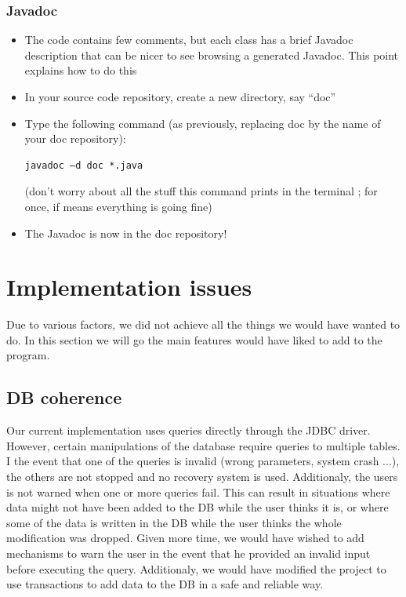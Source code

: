 \documentclass[a4paper ,12pt,french]{article}
\begin{document}
\subsubsection{Javadoc}


\begin{itemize}
\item The code contains few comments, but each class has a brief Javadoc description that can be nicer to see browsing a generated Javadoc. This point explains how to do this
\item In your source code repository, create a new directory, say “doc”
\item Type the following command (as previously, replacing doc by the name of your doc repository):
\begin{verbatim}
javadoc –d doc *.java
\end{verbatim}
(don’t worry about all the stuff this command prints in the terminal ; for once, if means everything is going fine)
\item The Javadoc is now in the doc repository!
\end{itemize}
\newpage

\section{Implementation issues}
Due to various factors, we did not achieve all the things we would have wanted to do. In this section we will go the main features would have liked to add to the program.

\subsection{DB coherence}
Our current implementation uses queries directly through the JDBC driver. However, certain manipulations of the database require queries to multiple tables. I the event that one of the queries is invalid (wrong parameters, system crash ...), the others are not stopped and no recovery system is used. Additionaly, the users is not warned when one or more queries fail. This can result in situations where data might not have been added to the DB while the user thinks it is, or where some of the data is written in the DB while the user thinks the whole modification was dropped.
Given more time, we would have wished to add mechanisms to warn the user in the event that he provided an invalid input before executing the query. Additionaly, we would have modified the project to use transactions to add data to the DB in a safe and reliable way.
\end{document}
